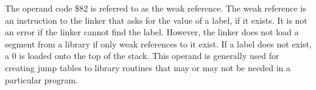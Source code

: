 \medskip

 The operand code \$82 is referred to as the
weak reference. The weak reference is an instruction to the linker that
asks for the value of a label, if it exists. It is not an error if the
linker cannot find the label. However, the linker does not load a segment
from a library if only weak references to it exist. If a label does not
exist, a 0 is loaded onto the top of the stack. This operand is generally
used for creating jump tables to library routines that may or may not
be needed in a particular program.

\vfill\eject

\bye
